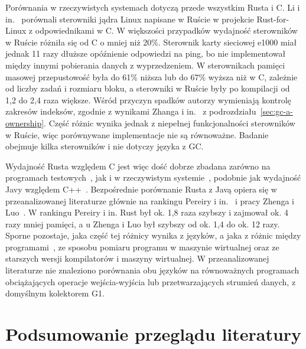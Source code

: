 Porównania w rzeczywistych systemach dotyczą przede wszystkim Rusta i C.
Li i in.~\cite{li2024} porównali sterowniki jądra Linux napisane w Ruście w projekcie Rust-for-Linux z odpowiednikami w C.
W większości przypadków wydajność sterowników w Ruście różniła się od C o mniej niż 20\%.
Sterownik karty sieciowej e1000 miał jednak 11 razy dłuższe opóźnienie odpowiedzi na ping, bo nie implementował między innymi pobierania danych z wyprzedzeniem.
W sterownikach pamięci masowej przepustowość była do 61\% niższa lub do 67\% wyższa niż w C, zależnie od liczby zadań i rozmiaru bloku, a sterowniki w Ruście były po kompilacji od 1,2 do 2,4 raza większe.
Wśród przyczyn spadków autorzy wymieniają kontrolę zakresów indeksów, zgodnie z wynikami Zhanga i in.~\cite{zhang2022} z podrozdziału~\ref{sec:gc-a-ownership}.
Część różnic wynika jednak z niepełnej funkcjonalności sterowników w Ruście, więc porównywane implementacje nie są równoważne.
Badanie obejmuje kilka sterowników i nie dotyczy języka z GC.

Wydajność Rusta względem C jest więc dość dobrze zbadana zarówno na programach testowych~\cite{zhang2022}, jak i w rzeczywistym systemie~\cite{li2024}, podobnie jak wydajność Javy względem C++~\cite{lion2022}.
Bezpośrednie porównanie Rusta z Javą opiera się w przeanalizowanej literaturze głównie na rankingu Pereiry i in.~\cite{pereira2021} i pracy Zhenga i Luo~\cite{zheng2026}.
W rankingu Pereiry i in. Rust był ok. 1,8 raza szybszy i zajmował ok. 4 razy mniej pamięci, a u Zhenga i Luo był szybszy od ok. 1,4 do ok. 12 razy.
Sporne pozostaje, jaka część tej różnicy wynika z języków, a jaka z różnic między programami~\cite{vankempen2025}, ze sposobu pomiaru programu w maszynie wirtualnej oraz ze starszych wersji kompilatorów i maszyny wirtualnej.
W przeanalizowanej literaturze nie znaleziono porównania obu języków na równoważnych programach obciążających operacje wejścia-wyjścia lub przetwarzających strumień danych, z domyślnym kolektorem G1.

\section{Podsumowanie przeglądu literatury}
\label{sec:podsumowanie-literatury}

